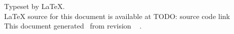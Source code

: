
\thispagestyle{empty}
\vspace*{\fill}

Typeset by \LaTeX.
\\
{\LaTeX} source for this document is available at
TODO: source code link
\\
This document generated \GITAuthorDate\ from revision
\ifx\GITTags\empty
\GITAbrHash
\else
\GITAbrHash\ \GITTags
\fi
.

